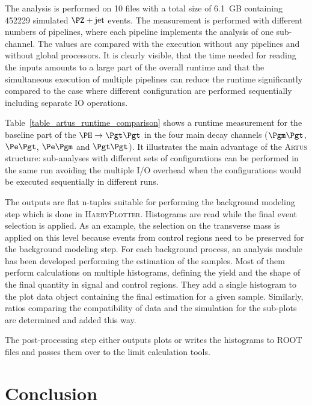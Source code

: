 \documentclass[3p]{elsarticle}
\newcommand{\software}[1]{\textsc{#1}\xspace}
\newcommand{\artus}{\software{Artus}}
\newcommand{\harryplotter}{\software{HarryPlotter}}
\begin{document}
\begin{table}[!ht]
{The analysis is performed on 10 files with a total size of 6.1~GB containing 452229 simulated $\PZ+\text{jet}$ events.
The measurement is performed with different numbers of pipelines, where each pipeline implements the analysis of one sub-channel.
The values are compared with the execution without any pipelines and without global processors.
It is clearly visible, that the time needed for reading the inputs amounts to a large part of the overall runtime and that the simultaneous execution of multiple pipelines can reduce the runtime significantly compared to the case where different configuration are performed sequentially including separate IO operations.}
\label{table_artus_runtime_comparison}
\end{table}

Table~\ref{table_artus_runtime_comparison} shows a runtime measurement for the baseline part of the $\PH\to\Pgt\Pgt$ in the four main decay channels ($\Pgm\Pgt$, $\Pe\Pgt$, $\Pe\Pgm$ and $\Pgt\Pgt$).
It illustrates the main advantage of the \artus structure: sub-analyses with different sets of configurations can be performed in the same run avoiding the multiple I/O overhead when the configurations would be executed sequentially in different runs.

The outputs are flat n-tuples suitable for performing the background modeling step which is done in \harryplotter.
Histograms are read while the final event selection is applied.
As an example, the selection on the transverse mass is applied on this level because events from control regions need to be preserved for the background modeling step.
For each background process, an analysis module has been developed performing the estimation of the samples.
Most of them perform calculations on multiple histograms, defining the yield and the shape of the final quantity in signal and control regions.
They add a single histogram to the plot data object containing the final estimation for a given sample.
Similarly, ratios comparing the compatibility of data and the simulation for the sub-plots are determined and added this way.

The post-processing step either outputs plots or writes the histograms to ROOT files and passes them over to the limit calculation tools.

\section{Conclusion}
\label{section_conclusion}
\end{document}
